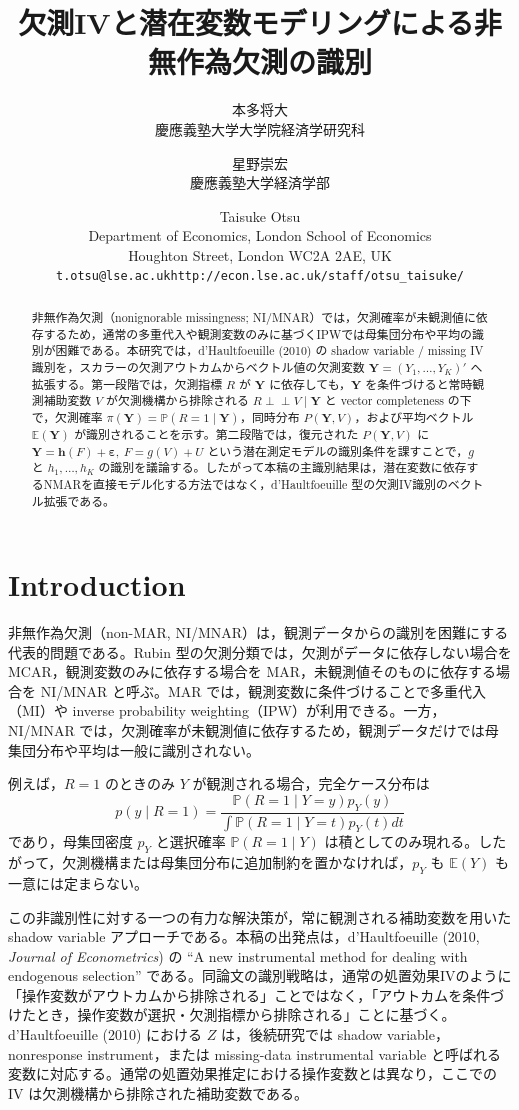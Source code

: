 \documentclass[10pt,a4paper]{article}
\title{欠測IVと潜在変数モデリングによる非無作為欠測の識別}
\author{%
本多将大\\[-1mm]
\small 慶應義塾大学大学院経済学研究科
\and
星野崇宏\\[-1mm]
\small 慶應義塾大学経済学部
\and
Taisuke Otsu\\[-1mm]
\small Department of Economics, London School of Economics\\[-1mm]
\small Houghton Street, London WC2A 2AE, UK\\[-1mm]
\small \texttt{t.otsu@lse.ac.uk}\quad \texttt{http://econ.lse.ac.uk/staff/otsu\_taisuke/}
}
\date{}
\newcommand{\indep}{\mathrel{\perp\!\!\!\perp}}
\newcommand{\E}{\mathbb{E}}
\newcommand{\Prb}{\mathbb{P}}
\newcommand{\1}{\mathbf{1}}
\newcommand{\Y}{\bm{Y}}
\newcommand{\eps}{\bm{\varepsilon}}
\begin{document}
\maketitle

\begin{abstract}
非無作為欠測（nonignorable missingness; NI/MNAR）では，欠測確率が未観測値に依存するため，通常の多重代入や観測変数のみに基づくIPWでは母集団分布や平均の識別が困難である。本研究では，d'Haultfoeuille (2010) の shadow variable / missing IV 識別を，スカラーの欠測アウトカムからベクトル値の欠測変数 $\Y=(Y_1,\ldots,Y_K)'$ へ拡張する。第一段階では，欠測指標 $R$ が $\Y$ に依存しても，$\Y$ を条件づけると常時観測補助変数 $V$ が欠測機構から排除される $R\indep V\mid \Y$ と vector completeness の下で，欠測確率 $\pi(\Y)=\Prb(R=1\mid \Y)$，同時分布 $P(\Y,V)$，および平均ベクトル $\E(\Y)$ が識別されることを示す。第二段階では，復元された $P(\Y,V)$ に $\Y=\bm h(F)+\eps,\ F=g(V)+U$ という潜在測定モデルの識別条件を課すことで，$g$ と $h_1,\ldots,h_K$ の識別を議論する。したがって本稿の主識別結果は，潜在変数に依存するNMARを直接モデル化する方法ではなく，d'Haultfoeuille 型の欠測IV識別のベクトル拡張である。
\end{abstract}

\section{Introduction}

非無作為欠測（non-MAR, NI/MNAR）は，観測データからの識別を困難にする代表的問題である。Rubin 型の欠測分類では，欠測がデータに依存しない場合を MCAR，観測変数のみに依存する場合を MAR，未観測値そのものに依存する場合を NI/MNAR と呼ぶ。MAR では，観測変数に条件づけることで多重代入（MI）や inverse probability weighting（IPW）が利用できる。一方，NI/MNAR では，欠測確率が未観測値に依存するため，観測データだけでは母集団分布や平均は一般に識別されない。

例えば，$R=1$ のときのみ $Y$ が観測される場合，完全ケース分布は
\begin{equation}
  p(y\mid R=1)=
  \frac{\Prb(R=1\mid Y=y)p_Y(y)}
       {\int \Prb(R=1\mid Y=t)p_Y(t)dt}
  \label{eq:intro-selected-density}
\end{equation}
であり，母集団密度 $p_Y$ と選択確率 $\Prb(R=1\mid Y)$ は積としてのみ現れる。したがって，欠測機構または母集団分布に追加制約を置かなければ，$p_Y$ も $\E(Y)$ も一意には定まらない。

この非識別性に対する一つの有力な解決策が，常に観測される補助変数を用いた shadow variable アプローチである。本稿の出発点は，d'Haultfoeuille (2010, \textit{Journal of Econometrics}) の ``A new instrumental method for dealing with endogenous selection'' である。同論文の識別戦略は，通常の処置効果IVのように「操作変数がアウトカムから排除される」ことではなく，「アウトカムを条件づけたとき，操作変数が選択・欠測指標から排除される」ことに基づく。d'Haultfoeuille (2010) における $Z$ は，後続研究では shadow variable，nonresponse instrument，または missing-data instrumental variable と呼ばれる変数に対応する。通常の処置効果推定における操作変数とは異なり，ここでの IV は欠測機構から排除された補助変数である。
\end{document}
